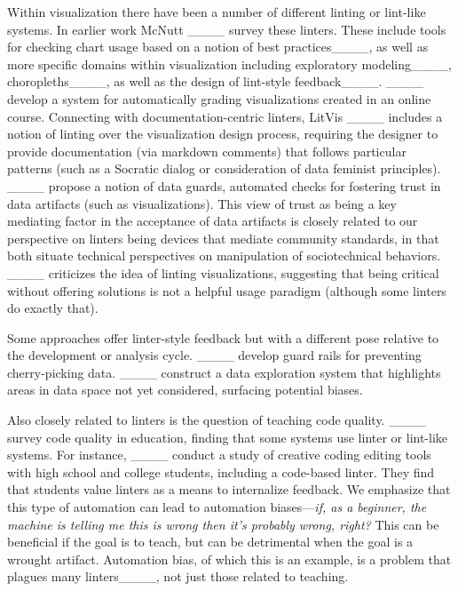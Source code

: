 Within visualization there have been a number of different linting or lint-like systems.
In earlier work McNutt \etal{}____ survey these linters.
These include tools for checking chart usage based on a notion of best practices____, as well as more specific domains within visualization including exploratory modeling____, choropleths____, as well as the design of lint-style feedback____.
____ develop a system for automatically grading visualizations created in an online course.
Connecting with documentation-centric linters, LitVis ____ includes a notion of linting over the visualization design process, requiring the designer to provide documentation (via markdown comments) that follows particular patterns (such as a Socratic dialog or consideration of data feminist principles).
____ propose a notion of data guards, automated checks for fostering trust in data artifacts (such as visualizations). This view of trust as being a key mediating factor in the acceptance of data artifacts is closely related to our perspective on linters being devices that mediate community standards, in that both situate technical perspectives on manipulation of sociotechnical behaviors.
____ criticizes the idea of linting visualizations, suggesting that being critical without offering solutions is not a helpful usage paradigm (although some linters do exactly that).



Some approaches offer linter-style feedback but with a different pose relative to the development or analysis cycle.
____ develop guard rails for preventing cherry-picking data.
____ construct a data exploration system that highlights areas in data space not yet considered, surfacing potential biases.

Also closely related to linters is the question of teaching code quality.  ____ survey code quality in education, finding that some systems use linter or lint-like systems.
For instance, ____ conduct a study of creative coding editing tools with high school and college students, including a code-based linter. They find that students value linters as a means to internalize feedback.
We emphasize that this type of automation can lead to automation biases---\emph{if, as a beginner, the machine is telling me this is wrong then it's probably wrong, right?} This can be beneficial if the goal is to teach, but can be detrimental when the goal is a wrought artifact.
Automation bias, of which this is an example, is a problem that plagues many linters____, not just those related to teaching.

